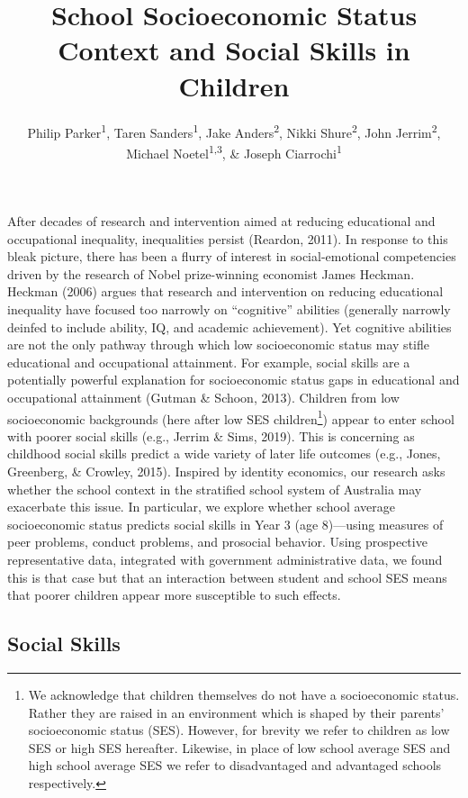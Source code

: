 \documentclass[
  english,
  man]{apa6}
\title{School Socioeconomic Status Context and Social Skills in Children}
\author{Philip Parker\textsuperscript{1}, Taren Sanders\textsuperscript{1}, Jake Anders\textsuperscript{2}, Nikki Shure\textsuperscript{2}, John Jerrim\textsuperscript{2}, Michael Noetel\textsuperscript{1,3}, \& Joseph Ciarrochi\textsuperscript{1}}
\date{}
\affiliation{\vspace{0.5cm}\textsuperscript{1} Institute for Positive Psychology and Education, Australian Catholic University\\\textsuperscript{2} UCL Institute of Education, UCL\\\textsuperscript{3} School of Health and Behavioural Sciences, Australian Catholic University}
\begin{document}
\maketitle

After decades of research and intervention aimed at reducing educational and occupational inequality, inequalities persist (Reardon, 2011). In response to this bleak picture, there has been a flurry of interest in social-emotional competencies driven by the research of Nobel prize-winning economist James Heckman. Heckman (2006) argues that research and intervention on reducing educational inequality have focused too narrowly on ``cognitive'' abilities (generally narrowly deinfed to include ability, IQ, and academic achievement). Yet cognitive abilities are not the only pathway through which low socioeconomic status may stifle educational and occupational attainment. For example, social skills are a potentially powerful explanation for socioeconomic status gaps in educational and occupational attainment (Gutman \& Schoon, 2013). Children from low socioeconomic backgrounds (here after low SES children\footnote{We acknowledge that children themselves do not have a socioeconomic status. Rather they are raised in an environment which is shaped by their parents' socioeconomic status (SES). However, for brevity we refer to children as low SES or high SES hereafter. Likewise, in place of low school average SES and high school average SES we refer to disadvantaged and advantaged schools respectively.}) appear to enter school with poorer social skills (e.g., Jerrim \& Sims, 2019). This is concerning as childhood social skills predict a wide variety of later life outcomes (e.g., Jones, Greenberg, \& Crowley, 2015). Inspired by identity economics, our research asks whether the school context in the stratified school system of Australia may exacerbate this issue. In particular, we explore whether school average socioeconomic status predicts social skills in Year 3 (age 8)---using measures of peer problems, conduct problems, and prosocial behavior. Using prospective representative data, integrated with government administrative data, we found this is that case but that an interaction between student and school SES means that poorer children appear more susceptible to such effects.

\hypertarget{social-skills}{%
\subsection{Social Skills}\label{social-skills}}
\end{document}
